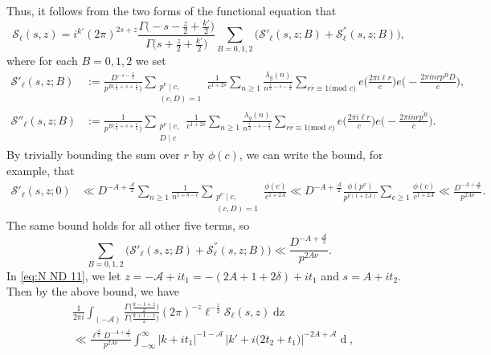 \documentclass[12pt]{amsart}
\theoremstyle{plain}
\theoremstyle{definition}
\begin{document}
Thus, it follows from the two forms of the functional equation that 
    \begin{equation}\label{eq:S ell s z}
    \mathcal{S}_\ell(s, z)
    =  i^{k'} (2\pi)^{2s+z}
    \frac{\Gamma\big(-s-\frac{z}{2}+\frac{k'}{2}\big)}{\Gamma\big(s+\frac{z}{2}+\frac{k'}{2}\big)}
    \sum_{B=0, 1, 2}\Big( \mathcal{S}'_\ell(s, z; B)+ {\mathcal{S}}^{''}_\ell(s, z; B) \Big),
    \end{equation}
where for each $B=0, 1, 2$ we set
    \begin{align*}
    \mathcal{S}'_\ell(s, z; B) &:= 
     \frac{ D^{-s-\frac{z}{2}}  }{p^{B(\frac12+s+\frac{z}{2}})} \sum_{\substack{p^\nu \mid c,\\ (c, D)=1}} \frac{1}{c^{1+2s}}  
    \sum_{n\geq 1} \frac{\lambda_g(n)}{n^{\frac12-s-\frac{z}{2}}}
    \sum_{r\overline{r} \equiv 1 \text{(mod } c )} e \Big(\frac{2\pi i \ell r}{c}\Big) e \Big(-\frac{2\pi i    nr \overline{p^B D} }{c}\Big) ,
    \\
    {\mathcal{S}}''_\ell(s, z; B) &:=    \frac{1}{p^{B(\frac12+s+\frac{z}{2}})}    \sum_{\substack{p^\nu \mid c,\\ D\mid c}} \frac{1}{c^{1+2s}} 
    \sum_{n\geq 1} \frac{\lambda_g(n)}{n^{\frac12-s-\frac{z}{2}}}
    \sum_{r\overline{r} \equiv 1 \text{(mod } c )} e \Big(\frac{2\pi i \ell r}{c}\Big) e \Big(-\frac{2\pi i   nr  \overline{p^B}}{c}\Big) .
    \end{align*}
By trivially bounding the sum over $r$ by $\phi(c)$, we can write the bound, for example, that
    \begin{align*} 
    \mathcal{S}'_\ell(s, z; 0) & \ll 
    D^{-A+\frac{\mathcal{A}}{2}} \sum_{n\geq 1} \frac{1}{n^{1+\delta-\epsilon}}
    \sum_{\substack{p^\nu \mid c,\\ (c, D)=1}} \frac{\phi(c)}{c^{1+2A}} 
    \ll D^{-A+\frac{\mathcal{A}}{2}}  \frac{\phi(p^\nu)}{p^{\nu(1+2A)}} \sum_{c\geq 1} \frac{\phi(c)}{c^{1+2A}} 
    \ll \frac{D^{-A+\frac{\mathcal{A}}{2}} }{p^{2A\nu}}.
    \end{align*}
The same bound holds for all other five terms, so
    \[
    \sum_{B=0, 1, 2}\Big( \mathcal{S}'_\ell(s, z; B) + {\mathcal{S}}^{''}_\ell(s, z; B) \Big)
    \ll \frac{D^{-A+\frac{\mathcal{A}}{2}} }{p^{2A\nu}} .
    \]
In \eqref{eq:N ND 11}, we let $z=-\mathcal{A}+it_1=-(2A+1+2\delta)+it_1$ and $s=A+it_2$. Then by the above bound, we have
    \begin{align*}
    &\frac{1}{2\pi i} \int_{(-\mathcal{A})} 
    \frac{\Gamma\big(\frac{k-1+z}{2}\big)}{\Gamma\Big(\frac{k+1-z}{2}\Big)} 
    (2\pi)^{-z} \ell^{-\frac{z}{2}}
    \mathcal{S}_\ell(s, z) \mathop{dz}
    \\
    &\ll
     \frac{\ell^{\frac{\mathcal{A}}{2}} D^{-A+\frac{\mathcal{A}}{2}} }{p^{2A\nu}}  
     \int_{-\infty}^\infty \big|k+it_1\big|^{-1-\mathcal{A}} \, \big| k' + i\big(2t_2+t_1 \big)\big|^{-2A+\mathcal{A}}  \mathop{dt_1},
    \end{align*}
\end{document}
